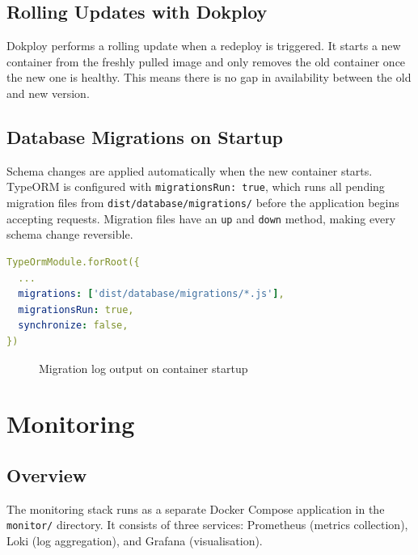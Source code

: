 \documentclass[12pt, a4paper]{article}
\begin{document}
\subsection{Rolling Updates with Dokploy}

Dokploy performs a rolling update when a redeploy is triggered. It starts a new container from the freshly pulled image and only removes the old container once the new one is healthy. This means there is no gap in availability between the old and new version.

\subsection{Database Migrations on Startup}

Schema changes are applied automatically when the new container starts. TypeORM is configured with \texttt{migrationsRun: true}, which runs all pending migration files from \texttt{dist/database/migrations/} before the application begins accepting requests. Migration files have an \texttt{up} and \texttt{down} method, making every schema change reversible.

\begin{lstlisting}[style=code, language=yaml, caption=TypeORM module configuration]
TypeOrmModule.forRoot({
  ...
  migrations: ['dist/database/migrations/*.js'],
  migrationsRun: true,
  synchronize: false,
})
\end{lstlisting}

\begin{figure}[H]
    \centering
    \fbox{\rule{0pt}{5cm}\rule{12cm}{0pt}}
    \caption{Migration log output on container startup}
    \label{fig:migrations}
\end{figure}

\section{Monitoring}

\subsection{Overview}

The monitoring stack runs as a separate Docker Compose application in the \texttt{monitor/} directory. It consists of three services: Prometheus (metrics collection), Loki (log aggregation), and Grafana (visualisation).
\end{document}
